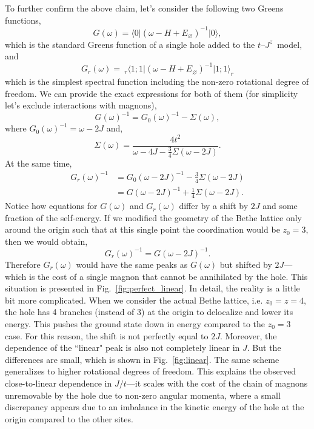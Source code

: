 \documentclass[11pt, a4paper, onecolumn]{article}
\newcommand{\ket}[1]{\vert #1 \rangle}
\newcommand{\bra}[1]{\langle #1 \vert}
\begin{document}
To further confirm the above claim, let's consider the following two Greens functions,
\begin{equation}
	G(\omega) = \bra{0}(\omega - H + E_{\varnothing})^{-1}\ket{0},
\end{equation}
which is the standard Greens function of a single hole added to the $t$--$J^z$~model, and
\begin{equation}
	G_r(\omega) =~_r\bra{1;1}(\omega - H + E_{\varnothing})^{-1}\ket{1;1}_r
\end{equation}
which is the simplest spectral function including the non-zero rotational degree of freedom. We can provide the exact expressions for both of them (for simplicity let's exclude interactions with magnons),
\begin{equation}
	G(\omega)^{-1} = G_0(\omega)^{-1} - \Sigma(\omega),
\end{equation}
where $G_0(\omega)^{-1} = \omega - 2J$ and,
\begin{equation}
	\Sigma(\omega) = \frac{4t^2}{\omega - 4J - \frac{3}{4}\Sigma(\omega - 2J)}.
\end{equation}
At the same time,
\begin{equation}
\begin{aligned}
	G_r(\omega)^{-1} 
	&= G_0(\omega - 2J)^{-1} - \frac{3}{4}\Sigma(\omega - 2J) \\
	&= G(\omega - 2J)^{-1} + \frac{1}{4}\Sigma(\omega - 2J).
\end{aligned}
\end{equation}
Notice how equations for $G(\omega)$ and $G_r(\omega)$ differ by a shift by $2J$ and some fraction of the self-energy. If we modified the geometry of the Bethe lattice only around the origin such that at this single point the coordination would be $z_0 = 3$, then we would obtain,
\begin{equation}
	G_r(\omega)^{-1} = G(\omega - 2J)^{-1}.	
\end{equation}
Therefore $G_r(\omega)$ would have the same peaks as $G(\omega)$ but shifted by $2J$---which is the cost of a single magnon that cannot be annihilated by the hole. This situation is presented in Fig.~\ref{fig:perfect_linear}. In detail, the reality is a little bit more complicated. When we consider the actual Bethe lattice, i.e. $z_0 = z = 4$, the hole has 4 branches (instead of 3) at the origin to delocalize and lower its energy. This pushes the ground state down in energy compared to the $z_0=3$ case. For this reason, the shift is not perfectly equal to $2J$. Moreover, the dependence of the ``linear" peak is also not completely linear in $J$. But the differences are small, which is shown in Fig.~\ref{fig:linear}. The same scheme generalizes to higher rotational degrees of freedom. This explains the observed close-to-linear dependence in $J/t$---it scales with the cost of the chain of magnons unremovable by the hole due to non-zero angular momenta, where a small discrepancy appears due to an imbalance in the kinetic energy of the hole at the origin compared to the other sites.
\end{document}
